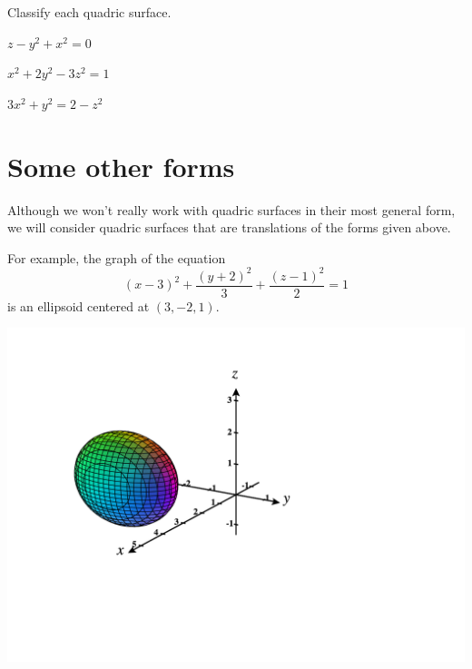 \documentclass{ximera}
\begin{document}
\begin{problem}
Classify each quadric surface.

$z-y^2+x^2=0$
\begin{multipleChoice}
\end{multipleChoice}

$x^2+2y^2-3z^2=1$
\begin{multipleChoice}
\end{multipleChoice}

$3x^2+y^2=2-z^2$
\begin{multipleChoice}
\end{multipleChoice}
\end{problem}

\section*{Some other forms}

Although we won't really work with quadric surfaces in their most general form, we will consider quadric surfaces that are translations of the forms given above.

For example, the graph of the equation
\[
(x-3)^2 + \frac{(y+2)^2}{3} + \frac{(z-1)^2}{2} = 1
\]
is an ellipsoid centered at $(3,-2,1)$.

\begin{image}
\includegraphics[width = \textwidth]{CalcPlot3D-shifted_ellipse}
\end{image}
\end{document}
